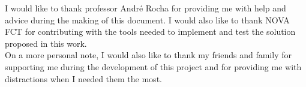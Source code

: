 
%

\begin{ntacknowledgements}


I would like to thank professor André Rocha for providing me with help and advice during the making of this document. I would also like to thank NOVA FCT for contributing with the tools needed to implement and test the solution proposed in this work.\\

On a more personal note, I would also like to thank my friends and family for supporting me during the development of this project and for providing me with distractions when I needed them the most.

\end{ntacknowledgements}